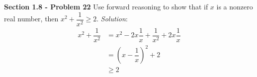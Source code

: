 \documentclass[10pt]{article}
\begin{document}
\clearpage
\textbf{Section 1.8 - Problem 22} Use forward reasoning to show that if $x$ is a nonzero real
number, then $x^{2} + \dfrac{1}{x^{2}} \geq 2$.
\bigbreak
\textit{Solution}:
    \begin{equation} \begin{aligned}
        x^2 + \dfrac{1}{x^{2}}
        & =  x^2 - 2x \dfrac{1}{x} + \dfrac{1}{x^{2}} + 2x \dfrac{1}{x} \\
        & =  (x - \dfrac{1}{x})^{2} + 2 \\
        & \geq 2
    \end{aligned} \end{equation}
\end{document}
